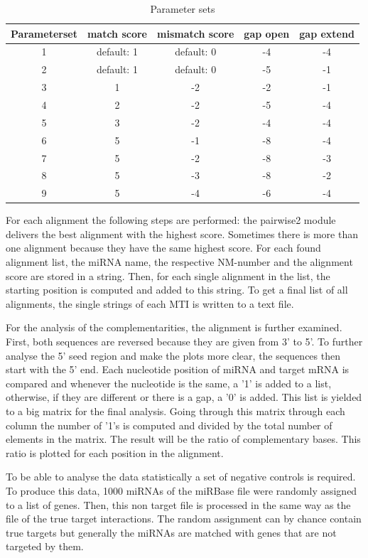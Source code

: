 \documentclass[12pt]{article}
\begin{document}
\begin{table}
\caption{Parameter sets}
\vspace{0.3cm}
\begin{tabular}{c|c|c|c|c}
Parameterset & match score & mismatch score & gap open & gap extend\\
\hline\hline 
1 & default: 1 & default: 0 & -4 & -4\\
2 &  default: 1 & default: 0 & -5 & -1 \\
3 &  1 & -2 & -2 & -1 \\
4 &  2 & -2 & -5 & -4 \\
5 &  3 & -2 & -4 & -4 \\
6 &  5 & -1 & -8 & -4 \\
7 &  5 & -2 & -8 & -3 \\
8 &  5 & -3 & -8 & -2 \\
9 &  5 & -4 & -6 & -4 \\
\hline
\end{tabular}
\label{table:parameter}
\end{table}

For each alignment the following steps are performed: the pairwise2 module delivers the best alignment with the highest score. Sometimes there is more than one alignment because they have the same highest score. For each found alignment list, the miRNA name, the respective NM-number and the alignment score are stored in a string. Then, for each single alignment in the list, the starting position is computed and added to this string. To get a final list of all alignments, the single strings of each MTI is written to a text file.

For the analysis of the complementarities, the alignment is further examined. First, both sequences are reversed because they are given from 3' to 5'. To further analyse the 5' seed region and make the plots more clear, the sequences then start with the 5' end. 
Each nucleotide position of miRNA and target mRNA is compared and whenever the nucleotide is the same, a '1' is added to a list, otherwise, if they are different or there is a gap, a '0' is added. This list is yielded to a big matrix for the final analysis. Going through this matrix through each column the number of '1's is computed and divided by the total number of elements in the matrix. The result will be the ratio of complementary bases. This ratio is plotted for each position in the alignment. 

To be able to analyse the data statistically a set of negative controls is required. To produce this data, 1000 miRNAs of the miRBase file were randomly assigned to a list of genes. Then, this non target file is processed in the same way as the file of the true target interactions. The random assignment can by chance contain true targets but generally the miRNAs are matched with genes that are not targeted by them. 
\end{document}
